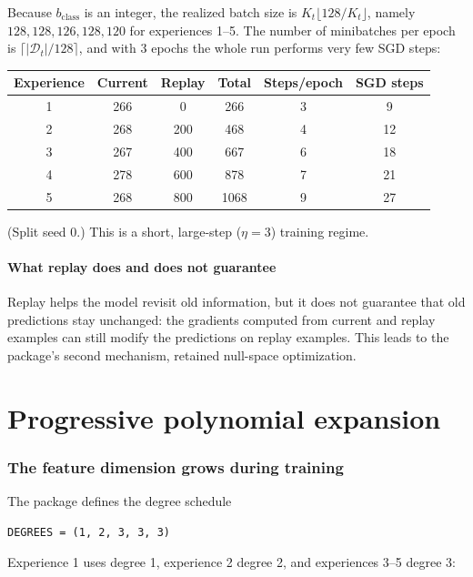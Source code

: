 \documentclass[11pt,a4paper]{article}
\begin{document}
\begin{verifybox}
Because $b_{\text{class}}$ is an integer, the realized batch size is $K_t\lfloor128/K_t\rfloor$, namely $128,128,126,128,120$ for experiences 1--5. The number of minibatches per epoch is $\lceil |\mathcal D_t|/128\rceil$, and with 3 epochs the whole run performs very few SGD steps:
\begin{center}
\begin{tabular}{@{}cccccc@{}}
\toprule
Experience & Current & Replay & Total & Steps/epoch & SGD steps\\
\midrule
1 & 266 & 0 & 266 & 3 & 9\\
2 & 268 & 200 & 468 & 4 & 12\\
3 & 267 & 400 & 667 & 6 & 18\\
4 & 278 & 600 & 878 & 7 & 21\\
5 & 268 & 800 & 1068 & 9 & 27\\
\bottomrule
\end{tabular}
\end{center}
(Split seed 0.) This is a short, large-step ($\eta=3$) training regime.
\end{verifybox}

\subsection{What replay does and does not guarantee}

Replay helps the model revisit old information, but it does not guarantee that old predictions stay unchanged: the gradients computed from current and replay examples can still modify the predictions on replay examples. This leads to the package's second mechanism, retained null-space optimization.

\part{Progressive polynomial expansion}

\section{The feature dimension grows during training}

The package defines the degree schedule
\begin{lstlisting}
DEGREES = (1, 2, 3, 3, 3)
\end{lstlisting}
Experience 1 uses degree 1, experience 2 degree 2, and experiences 3--5 degree 3:
\end{document}
